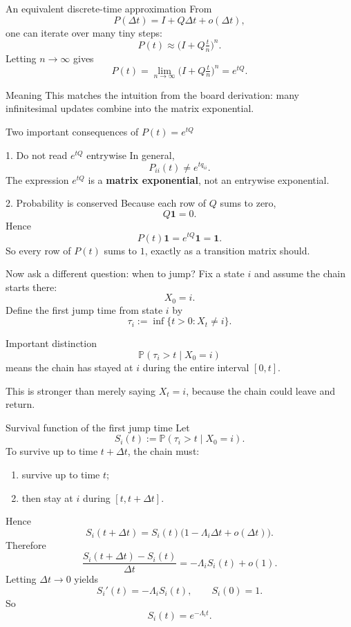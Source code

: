 \documentclass[aspectratio=169,professionalfonts]{beamer}
\newcommand{\Prob}{\mathbb{P}}
\begin{document}
\begin{frame}{An equivalent discrete-time approximation}
\small
From
\[
P(\Delta t)=I+Q\Delta t+o(\Delta t),
\]
one can iterate over many tiny steps:
\[
P(t)\approx \bigl(I+Q\tfrac{t}{n}\bigr)^n.
\]
Letting $n\to\infty$ gives
\[
P(t)=\lim_{n\to\infty}\bigl(I+Q\tfrac{t}{n}\bigr)^n=e^{tQ}.
\]

\begin{alertblock}{Meaning}
This matches the intuition from the board derivation:
many infinitesimal updates combine into the matrix exponential.
\end{alertblock}
\end{frame}

\begin{frame}{Two important consequences of $P(t)=e^{tQ}$}
\small
\begin{block}{1. Do not read $e^{tQ}$ entrywise}
In general,
\[
P_{ii}(t)\neq e^{t q_{ii}}.
\]
The expression $e^{tQ}$ is a \textbf{matrix exponential}, not an entrywise exponential.
\end{block}

\begin{alertblock}{2. Probability is conserved}
Because each row of $Q$ sums to zero,
\[
Q\mathbf 1=0.
\]
Hence
\[
P(t)\mathbf 1=e^{tQ}\mathbf 1=\mathbf 1.
\]
So every row of $P(t)$ sums to $1$, exactly as a transition matrix should.
\end{alertblock}
\end{frame}

\begin{frame}{Now ask a different question: when to jump?}
\small
Fix a state $i$ and assume the chain starts there:
\[
X_0=i.
\]
Define the first jump time from state $i$ by
\[
\tau_i:=\inf\{t>0:X_t\neq i\}.
\]

\begin{block}{Important distinction}
\[
\Prob(\tau_i>t\mid X_0=i)
\]
means the chain has stayed at $i$ during the entire interval $[0,t]$.

This is stronger than merely saying $X_t=i$, because the chain could leave and return.
\end{block}
\end{frame}

\begin{frame}{Survival function of the first jump time}
\small
Let
\[
S_i(t):=\Prob(\tau_i>t\mid X_0=i).
\]
To survive up to time $t+\Delta t$, the chain must:
\begin{enumerate}
  \item survive up to time $t$;
  \item then stay at $i$ during $[t,t+\Delta t]$.
\end{enumerate}

Hence
\[
S_i(t+\Delta t)=S_i(t)\bigl(1-\Lambda_i\Delta t+o(\Delta t)\bigr).
\]
Therefore
\[
\frac{S_i(t+\Delta t)-S_i(t)}{\Delta t}
=-\Lambda_i S_i(t)+o(1).
\]
Letting $\Delta t\to 0$ yields
\[
S_i'(t)=-\Lambda_i S_i(t),\qquad S_i(0)=1.
\]
So
\[
S_i(t)=e^{-\Lambda_i t}.
\]
\end{frame}
\end{document}
